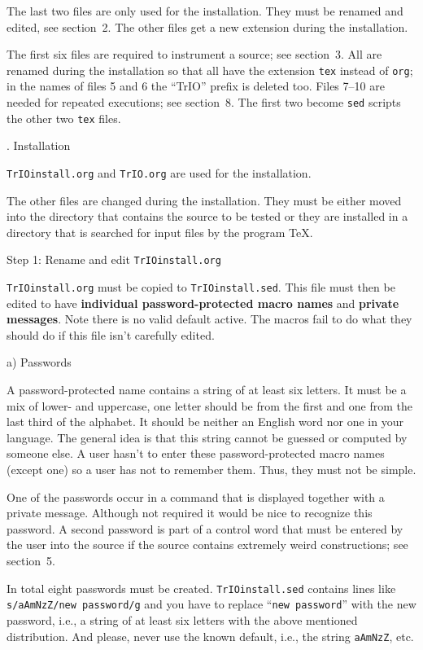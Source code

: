 The last two files are only used for the installation. They must be
renamed and edited, see section~2. The other files get a new extension
during the installation.

The first six files are required to instrument a source; see
section~3. All are renamed during the installation so that all have
the extension {\tt tex} instead of {\tt org}; in the names of files 5
and 6 the ``TrIO'' prefix is deleted too. Files 7--10 are needed for
repeated executions; see section~8. The first two become {\tt sed}
scripts the other two {\tt tex} files.



. Installation

{\tt TrIOinstall.org} and {\tt TrIO.org} are used for the installation. 

The other files are changed during the installation. They must be
either moved into the directory that contains the source to be tested
or they are installed in a directory that is searched for input files
by the program \TeX.

\beginsection Step 1: \rm Rename and edit {\tt TrIOinstall.org}

{\tt TrIOinstall.org} must be copied to {\tt TrIOinstall.sed}. This
file must then be edited to have {\bf individual password-protected
macro names} and {\bf private messages}. Note there is no valid
default active. The macros fail to do what they should do if this file
isn't carefully edited.

\beginsection \rm a) Passwords

A password-protected name contains a string of at least six
letters. It must be a mix of lower- and uppercase, one letter should
be from the first and one from the last third of the alphabet. It
should be neither an English word nor one in your language. The
general idea is that this string cannot be guessed or computed by
someone else. A user hasn't to enter these password-protected macro
names (except one) so a user has not to remember them. Thus, they must
not be simple.

One of the passwords occur in a command that is displayed together
with a private message. Although not required it would be nice to
recognize this password. A second password is part of a control word
that must be entered by the user into the source if the source
contains extremely weird constructions; see section~5.

In total eight passwords must be created. {\tt TrIOinstall.sed}
contains lines like
\smallskip\noindent
{\tt s/aAmNzZ/new password/g}
\smallskip\noindent
and you have to replace ``{\tt new password}'' with the new password,
i.e., a string of at least six letters with the above mentioned
distribution. And please, never use the known default, i.e., the
string {\tt aAmNzZ}, etc.

